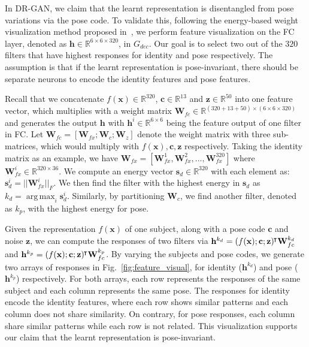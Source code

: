 \documentclass[10pt,journal,compsoc]{IEEEtran}
\begin{document}
\label{sec:ablation_disentangled_representation}
In DR-GAN, we claim that the learnt representation is disentangled from pose variations via the pose code. 
To validate this, following the energy-based weight visualization method proposed in~\cite{yin2017multi}, we perform feature visualization on the FC layer, denoted as $\mathbf{h}\in \mathbb{R}^{ 6\times6\times320}$, in $G_{dec}$.
Our goal is to select two out of the $320$ filters that have highest responses for identity and pose respectively. 
The assumption is that if the learnt representation is pose-invariant, there should be separate neurons to encode the identity features and pose features. 

Recall that we concatenate $f(\mathbf{x})\in \mathbb{R}^{320}$, $\mathbf{c}\in \mathbb{R}^{13}$ and $\mathbf{z}\in\mathbb{R}^{50}$ into one feature vector, which multiplies with a weight matrix $\mathbf{W}_{fc} \in \mathbb{R}^{(320+13+50)\times(6\times6\times320)}$ and generates the output $\mathbf{h}$ with $\mathbf{h}^{i}\in\mathbb{R}^{6\times6}$ being the feature output of one filter in FC. %
Let $\mathbf{W}_{fc} = [\mathbf{W}_{fx}; \mathbf{W}_{c}; \mathbf{W}_{z}]$ denote the weight matrix with three sub-matrices, which would multiply with $f(\mathbf{x}), \mathbf{c}, \mathbf{z}$ respectively. 
Taking the identity matrix as an example, we have $\mathbf{W}_{fx}=[\mathbf{W}_{fx}^1, \mathbf{W}_{fx}^2, ..., \mathbf{W}_{fx}^{320}]$ where $\mathbf{W}_{fx}^i\in\mathbb{R}^{320\times36}$. %
We compute an energy vector $\mathbf{s}_d\in\mathbb{R}^{320}$ with each element as: $\mathbf{s}_{d}^i = || \mathbf{W}_{fx}^i ||_F$.
We then find the filter with the highest energy in $\mathbf{s}_d$ as $k_d =\operatorname*{arg\,max}_i \mathbf{s}_d^i$.
Similarly, by partitioning $\mathbf{W}_c$, we find another filter, denoted as $k_p$, with the highest energy for pose. 

Given the representation $f(\mathbf{x})$ of one subject, along with a pose code $\mathbf{c}$ and noise $\mathbf{z}$, we can compute the responses of two filters via $\mathbf{h}^{k_d} = (f(\mathbf{x}); \mathbf{c}; \mathbf{z})^{\hspace{-1pt}\intercal}\mathbf{W}_{fc}^{k_d}$ and $\mathbf{h}^{k_p} = (f(\mathbf{x}); \mathbf{c}; \mathbf{z})^{\hspace{-1pt}\intercal}\mathbf{W}_{fc}^{k_p}$.
%
By varying the subjects and pose codes, we generate two arrays of responses in Fig.~\ref{fig:feature_visual}, for identity ($\mathbf{h}^{k_d}$) and pose ($\mathbf{h}^{k_p}$) respectively.
%
For both arrays, each row represents the responses of the same subject and each column represents the same pose. %
The responses for identity encode the identity features, where each row shows similar patterns and each column does not share similarity. 
On contrary, for pose responses, each column share similar patterns while each row is not related. 
This visualization supports our claim that the learnt representation is pose-invariant. 
\end{document}
